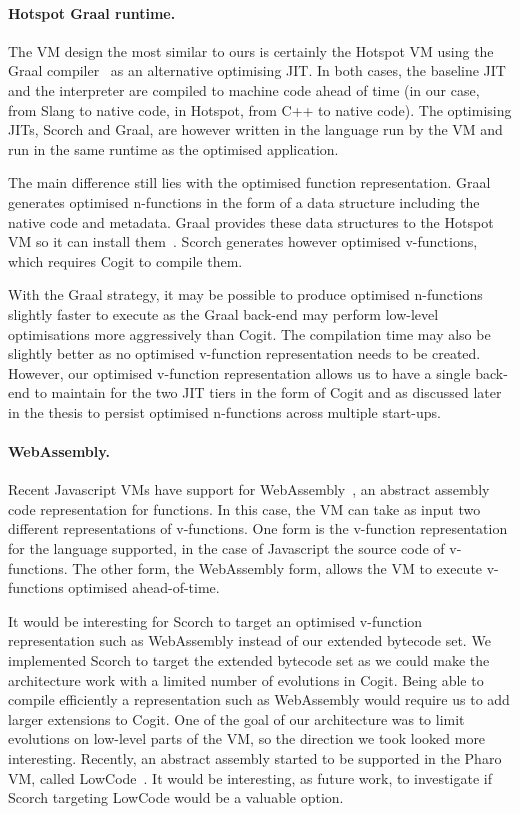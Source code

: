\documentclass[a4paper,12pt,twoside]{../includes/ThesisStyle}
\begin{document}
\paragraph{Hotspot Graal runtime.}
The VM design the most similar to ours is certainly the Hotspot VM using the Graal compiler~\cite{Oracle13,Dubo13c} as an alternative optimising JIT. In both cases, the baseline JIT and the interpreter are compiled to machine code ahead of time (in our case, from Slang to native code, in Hotspot, from C++ to native code). The optimising JITs, Scorch and Graal, are however written in the language run by the VM and run in the same runtime as the optimised application. 

The main difference still lies with the optimised function representation. Graal generates optimised n-functions in the form of a data structure including the native code and metadata. Graal provides these data structures to the Hotspot VM so it can install them~\cite{Grim13a}. Scorch generates however optimised v-functions, which requires Cogit to compile them. 

With the Graal strategy, it may be possible to produce optimised n-functions slightly faster to execute as the Graal back-end may perform low-level optimisations more aggressively than Cogit. The compilation time may also be slightly better as no optimised v-function representation needs to be created. However, our optimised v-function representation allows us to have a single back-end to maintain for the two JIT tiers in the form of Cogit and as discussed later in the thesis to persist optimised n-functions across multiple start-ups.

\paragraph{WebAssembly.}
Recent Javascript VMs have support for WebAssembly~\cite{WebAssembly}, an abstract assembly code representation for functions. In this case, the VM can take as input two different representations of v-functions. One form is the v-function representation for the language supported, in the case of Javascript the source code of v-functions. The other form, the WebAssembly form, allows the VM to execute v-functions optimised ahead-of-time.

It would be interesting for Scorch to target an optimised v-function representation such as WebAssembly instead of our extended bytecode set. We implemented Scorch to target the extended bytecode set as we could make the architecture work with a limited number of evolutions in Cogit. Being able to compile efficiently a representation such as WebAssembly would require us to add larger extensions to Cogit. One of the goal of our architecture was to limit evolutions on low-level parts of the VM, so the direction we took looked more interesting. Recently, an abstract assembly started to be supported in the Pharo VM, called LowCode~\cite{Salg16a}. It would be interesting, as future work, to investigate if Scorch targeting LowCode would be a valuable option.
\end{document}
